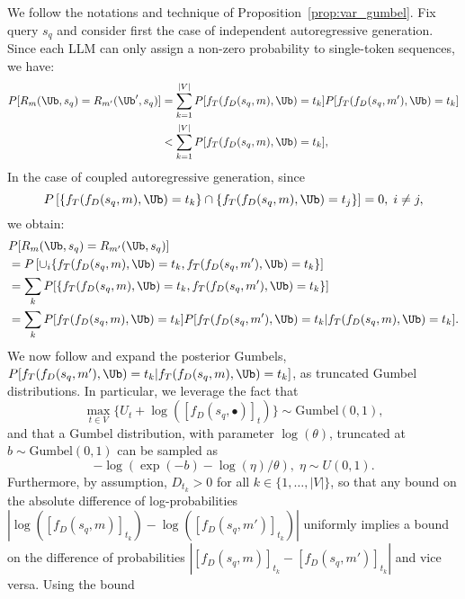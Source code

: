 We follow the notations and technique of Proposition~\ref{prop:var_gumbel}.
Fix query $s_q$ and consider first the case of independent autoregressive generation. Since each LLM can only assign a non-zero probability to single-token sequences, we have:
\begin{equation*}
    \begin{split}
        \PP[R_m(\Ub, s_q)=R_{m'}(\Ub', s_q)]&=\sum_{k=1}^{|V|}\PP[f_T(f_D(s_q,m),\Ub)=t_k] \PP[f_T(f_D(s_q,m'),\Ub)=t_k]\\
        &<\sum_{k=1}^{|V|}\PP[f_T(f_D(s_q,m),\Ub)=t_k],
    \end{split}
\end{equation*}
%
In the case of coupled autoregressive generation, since
\begin{equation*}
    \PP\left[\{f_T(f_D(s_q,m),\Ub)=t_k\} \cap \{f_T(f_D(s_q,m),\Ub)=t_j \}\right]=0,\; i\neq j,
\end{equation*}
%
we obtain:
\begin{equation*}
    \begin{split}
        &\PP[R_m(\Ub, s_q)=R_{m'}(\Ub, s_q)]\\
        &=\PP\left[\cup_i \{ f_T(f_D(s_q,m),\Ub)=t_k, f_T(f_D(s_q,m'),\Ub)=t_k \} \right]\\
        &=\sum_k\PP[\{f_T(f_D(s_q,m),\Ub)=t_k, f_T(f_D(s_q,m'),\Ub)=t_k \}]\\
        &=\sum_k \PP[f_T(f_D(s_q,m),\Ub)=t_k]\PP[f_T(f_D(s_q,m'),\Ub)=t_k|f_T(f_D(s_q,m),\Ub)=t_k].\\
    \end{split}
\end{equation*}
We now follow \cite{9729603} and expand the posterior Gumbels, $\PP[f_T(f_D(s_q,m'),\Ub)=t_k|f_T(f_D(s_q,m),\Ub)=t_k]$, as truncated Gumbel distributions. In particular, we leverage the fact that
\begin{equation}\label{eq:max of gumbels}
    \max_{t\in V}\{U_t+\log([f_D(s_q,\bullet)]_{t})\} \sim \text{Gumbel}(0,1),
\end{equation}
and that a Gumbel distribution, with parameter $\log (\theta)$, truncated at $b\sim \text{Gumbel}(0,1)$  can be sampled as
\begin{equation}\label{eq: truncated gumbel}
    -\log(\exp(-b)-\log(\eta)/\theta),\; \eta \sim U(0,1).
\end{equation}
Furthermore, by assumption, $D_{t_k} > 0$ for all $k \in \{1, \ldots, |V|\}$, so that any bound on the absolute difference of log-probabilities $|\log ( [f_D(s_q,m)]_{t_k}) -\log ([f_D(s_q,m')]_{t_k}) |$ uniformly implies a bound on the difference of probabilities $|[f_D(s_q,m)]_{t_k} -[f_D(s_q,m')]_{t_k} |$ and vice versa. Using the bound 

